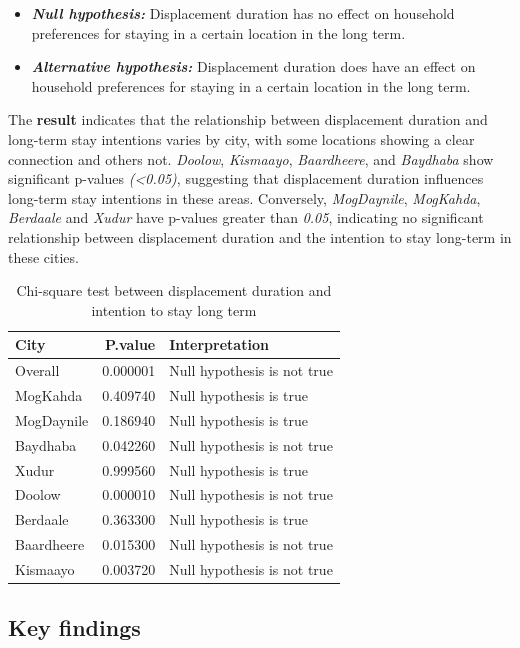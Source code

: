 \documentclass[
]{article}
\begin{document}
\begin{itemize}
\item
  \textbf{\emph{Null hypothesis:}} Displacement duration has no effect
  on household preferences for staying in a certain location in the long
  term.
\item
  \textbf{\emph{Alternative hypothesis:}} Displacement duration does
  have an effect on household preferences for staying in a certain
  location in the long term.
\end{itemize}

The \textbf{result} indicates that the relationship between displacement
duration and long-term stay intentions varies by city, with some
locations showing a clear connection and others not. \emph{Doolow},
\emph{Kismaayo}, \emph{Baardheere}, and \emph{Baydhaba} show significant
p-values \emph{(\textless0.05)}, suggesting that displacement duration
influences long-term stay intentions in these areas. Conversely,
\emph{MogDaynile}, \emph{MogKahda}, \emph{Berdaale} and \emph{Xudur}
have p-values greater than \emph{0.05}, indicating no significant
relationship between displacement duration and the intention to stay
long-term in these cities.

\begin{longtable}[t]{lrl}
\caption{\label{tab:unnamed-chunk-7}Chi-square test between displacement duration and intention to stay long term}\\
\toprule
City & P.value & Interpretation\\
\midrule
Overall & 0.000001 & Null hypothesis is not true\\
MogKahda & 0.409740 & Null hypothesis is true\\
MogDaynile & 0.186940 & Null hypothesis is true\\
Baydhaba & 0.042260 & Null hypothesis is not true\\
Xudur & 0.999560 & Null hypothesis is true\\
\addlinespace
Doolow & 0.000010 & Null hypothesis is not true\\
Berdaale & 0.363300 & Null hypothesis is true\\
Baardheere & 0.015300 & Null hypothesis is not true\\
Kismaayo & 0.003720 & Null hypothesis is not true\\
\bottomrule
\end{longtable}

\subsection{Key findings}\label{key-findings}
\end{document}
